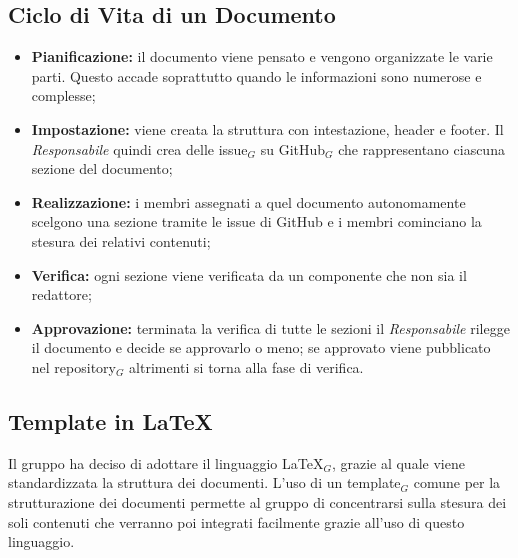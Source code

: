 \subsection{Ciclo di Vita di un Documento}
\begin{itemize}
    \item \textbf{Pianificazione:} il documento viene pensato e vengono organizzate le varie parti. Questo accade soprattutto quando le informazioni sono numerose e complesse;
    \item \textbf{Impostazione:} viene creata la struttura con intestazione, header e footer. Il \textit{Responsabile} quindi crea delle issue$_G$ su GitHub$_G$ che rappresentano ciascuna sezione del documento;
    \item \textbf{Realizzazione:} i membri assegnati a quel documento autonomamente scelgono una sezione tramite le issue di GitHub e i membri cominciano la stesura dei relativi contenuti;
    \item \textbf{Verifica:} ogni sezione viene verificata da un componente che non sia il redattore;
    \item \textbf{Approvazione:} terminata la verifica di tutte le sezioni il \textit{Responsabile} rilegge il documento e decide se approvarlo o meno; se approvato viene pubblicato nel repository$_G$ altrimenti si torna alla fase di verifica.
\end{itemize}
\subsection{Template in \LaTeX{}}
Il gruppo ha deciso di adottare il linguaggio \LaTeX{}$_G$, grazie al quale viene standardizzata
la struttura dei documenti. L’uso di un template$_G$ comune per la strutturazione dei documenti permette al gruppo di concentrarsi sulla stesura dei soli contenuti che verranno poi integrati facilmente grazie all'uso di questo linguaggio.
